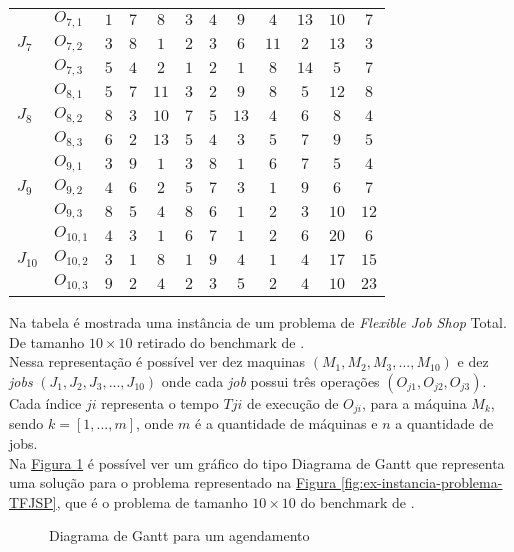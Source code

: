 \begin{table}[htb]
\begin{tabular}[t]{llcccccccccc}
\multirow{3}{*}{$J_7$}&$O_{7,1}$ & $1$ & $7$ & $8$ & $3$ & $4$ & $9$ & $4$ & $13$ & $10$ & $7$\\
&$O_{7,2}$ & $3$ & $8$ & $1$ & $2$ & $3$ & $6$ & $11$ & $2$ & $13$ & $3$\\
&$O_{7,3}$ & $5$ & $4$ & $2$ & $1$ & $2$ & $1$ & $8$ & $14$ & $5$ & $7$\\
\multirow{3}{*}{$J_8$}&$O_{8,1}$ & $5$ & $7$ & $11$ & $3$ & $2$ & $9$ & $8$ & $5$ & $12$ & $8$\\
&$O_{8,2}$ & $8$ & $3$ & $10$ & $7$ & $5$ & $13$ & $4$ & $6$ & $8$ & $4$\\
&$O_{8,3}$ & $6$ & $2$ & $13$ & $5$ & $4$ & $3$ & $5$ & $7$ & $9$ & $5$\\
\multirow{3}{*}{$J_9$}&$O_{9,1}$ & $3$ & $9$ & $1$ & $3$ & $8$ & $1$ & $6$ & $7$ & $5$ & $4$\\
&$O_{9,2}$ & $4$ & $6$ & $2$ & $5$ & $7$ & $3$ & $1$ & $9$ & $6$ & $7$\\
&$O_{9,3}$ & $8$ & $5$ & $4$ & $8$ & $6$ & $1$ & $2$ & $3$ & $10$ & $12$\\
\multirow{3}{*}{$J_{10}$}&$O_{10,1}$ & $4$ & $3$ & $1$ & $6$ & $7$ & $1$ & $2$ & $6$ & $20$ & $6$\\
&$O_{10,2}$ & $3$ & $1$ & $8$ & $1$ & $9$ & $4$ & $1$ & $4$ & $17$ & $15$\\
&$O_{10,3}$ & $9$ & $2$ & $4$ & $2$ & $3$ & $5$ & $2$ & $4$ & $10$ & $23$\\
\hline
    \end{tabular}
\end{table}
Na tabela é mostrada uma instância de um problema de \textit{Flexible Job Shop} Total. De tamanho $10\times10$ retirado do benchmark de \cite{Kacem2002}.\\
%
\indent Nessa representação é possível ver dez maquinas $(M_1, M_2, M_3, ..., M_{10})$ e dez \textit{jobs} $(J_1, J_2, J_3, ..., J_{10})$ onde cada \textit{job} possui três operações $(O_{j1}, O_{j2}, O_{j3})$.\\
%
Cada índice $ji$ representa o tempo $T{ji}$ de execução de $O_{ji}$, para a máquina $M_k$, 
sendo $k=[1, ..., m]$, onde $m$ é a quantidade de máquinas e $n$ a quantidade de jobs.\\
\indent Na 
\hyperref[fig:plot-gantt]{Figura \ref{fig:plot-gantt}} 
é possível ver um gráfico do tipo Diagrama de Gantt que representa uma solução para o problema representado na 
\hyperref[fig:ex-instancia-problema-TFJSP]{Figura \ref{fig:ex-instancia-problema-TFJSP}}, 
que é o problema de tamanho $10\times10$ do benchmark de  \cite{Kacem2002}.\\
\begin{figure}[ht]
    \centering
    \caption{Diagrama de Gantt para um agendamento}
    \label{fig:plot-gantt}
    \resizebox{\textwidth}{!}{}
\end{figure}
            
